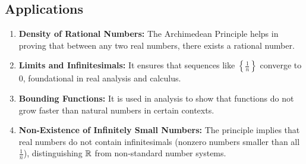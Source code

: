 \subsection{Applications}

\begin{enumerate}
	
	\item \textbf{Density of Rational Numbers:} The Archimedean Principle helps in proving that between 
		   any two real numbers, there exists a rational number.

	\item \textbf{Limits and Infinitesimals:} It ensures that sequences like 
	      \( \left\{ \frac{1}{n} \right\}\) converge to 0, foundational in real analysis and calculus.

	\item \textbf{Bounding Functions:} It is used in analysis to show that functions do not grow faster 
	      than natural numbers in certain contexts.

	\item \textbf{Non-Existence of Infinitely Small Numbers:} The principle implies that real numbers do 
	      not contain infinitesimals (nonzero numbers smaller than all \( \frac{1}{n} \)), distinguishing 
		  \( \mathbb{R} \) from non-standard number systems.

\end{enumerate}

